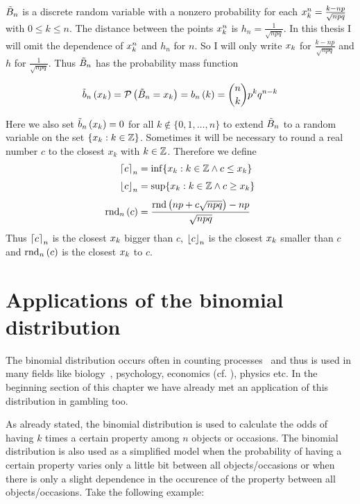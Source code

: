 $\BBs$ is a discrete random variable with a nonzero probability for each $\x[k]^n = \frac{k-np}{\sqrt{npq}}$ with $0\le k\le n$. The distance between the points $\x[k]^n$  is $h_n = \frac{1}{\sqrt{npq}}$. In this thesis I will omit the dependence of $\x^n$ and $h_n$ for $n$. So I will only write $\x$ for $\frac{k-np}{\sqrt{npq}}$ and $h$ for $\frac 1{\sqrt{npq}}$. Thus $\BBs$ has the probability mass function

\begin{align}
  \bb{\x[k]} = \P{\BBs = \x[k]} = \b{k} = \binom nk p^kq^{n-k}
\end{align}

Here we also set $\bb{\x[k]}=0$ for all $k\notin\{0,1,\ldots,n\}$ to extend $\BBs$ to a random variable on the set $\{\x[k] : k\in\Z\}$. Sometimes it will be necessary to round a real number $c$ to the closest $x_k$ with $k\in\Z$. Therefore we define
\begin{align}
  \xup{c} &= \inf \{ x_k : k\in\Z \land c \le x_k \} \nl
  \xdown{c} &= \sup \{ x_k : k \in \Z \land c \ge x_k \} \nl
  \xrnd{c} &= \frac{\rnd{np+c\sqrt{npq}}-np}{\sqrt{npq}}
\end{align}
Thus $\xup{c}$ is the closest $\x$ bigger than $c$, $\xdown{c}$ is the closest $\x$ smaller than $c$ and $\xrnd{c}$ is the closest $\x$ to $c$.

\section{Applications of the binomial distribution}

The binomial distribution occurs often in counting processes~\cite[p. 138]{henze} and thus is used in many fields like biology~\cite[p. 146]{henze}, psychology, economics (cf. \cite[p. 59]{irle}), physics etc.  In the beginning section of this chapter we have already met an application of this distribution in gambling too.


As already stated, the binomial distribution is used to calculate the odds of having $k$ times a certain property among $n$ objects or occasions. The binomial distribution is also used as a simplified model when the probability of having a certain property varies only a little bit between all objects/occasions or when there is only a slight dependence in the occurence of the property between all objects/occasions. Take the following example:

